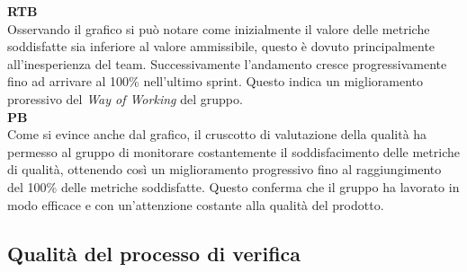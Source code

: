 \textbf{RTB} \\
Osservando il grafico si può notare come inizialmente il valore delle metriche soddisfatte sia inferiore al valore ammissibile, questo è dovuto principalmente all'inesperienza del team. Successivamente l'andamento cresce progressivamente fino ad arrivare al 100\% nell'ultimo sprint. Questo indica un miglioramento proressivo del \textit{Way of Working} del gruppo. \\

\textbf{PB} \\
Come si evince anche dal grafico, il cruscotto di valutazione della qualità ha permesso al gruppo di monitorare costantemente il soddisfacimento delle metriche di qualità, ottenendo così un miglioramento progressivo fino al raggiungimento del 100\% delle metriche soddisfatte. Questo conferma che il gruppo ha lavorato in modo efficace e con un'attenzione costante alla qualità del prodotto.



\newpage
\subsection{Qualità del processo di verifica}
